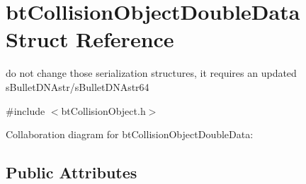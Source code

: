 \hypertarget{structbt_collision_object_double_data}{\section{bt\+Collision\+Object\+Double\+Data Struct Reference}
\label{structbt_collision_object_double_data}
}


do not change those serialization structures, it requires an updated s\+Bullet\+D\+N\+Astr/s\+Bullet\+D\+N\+Astr64  




{\ttfamily \#include $<$bt\+Collision\+Object.\+h$>$}



Collaboration diagram for bt\+Collision\+Object\+Double\+Data\+:
\subsection*{Public Attributes}
